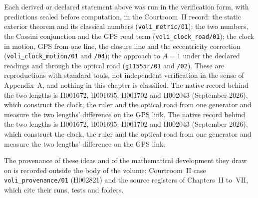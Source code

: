 Each derived or declared statement above was run in the verification form, with predictions sealed before computation, in the Courtroom~II record: the static exterior theorem and its classical numbers (\texttt{voli\_metric/01}); the two numbers, the Cassini conjunction and the GPS road term (\texttt{voli\_clock\_road/01}); the clock in motion, GPS from one line, the closure line and the eccentricity correction (\texttt{voli\_clock\_motion/01} and \texttt{/04}); the approach to $A=1$ under the declared readings and through the optical road (\texttt{g11555r/01} and \texttt{/02}). These are reproductions with standard tools, not independent verification in the sense of Appendix~A, and nothing in this chapter is classified. The native record behind the two lengths is H001672, H001695, H001702 and H002043 (September 2026), which construct the clock, the ruler and the optical road from one generator and measure the two lengths' difference on the GPS link. The native record behind the two lengths is H001672, H001695, H001702 and H002043 (September 2026), which construct the clock, the ruler and the optical road from one generator and measure the two lengths' difference on the GPS link.

The provenance of these ideas and of the mathematical development they draw on is recorded outside the body of the volume: Courtroom~II case \texttt{voli\_provenance/01} (H002821) and the source registers of Chapters~II to~VII, which cite their runs, tests and folders.
